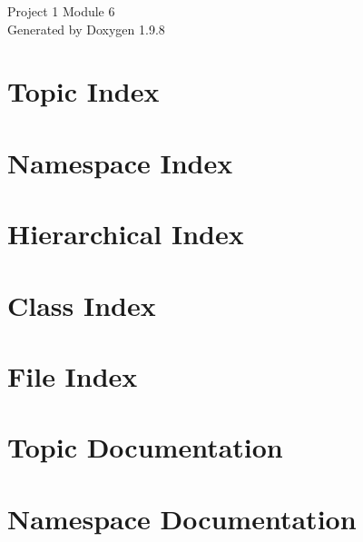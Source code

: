 \documentclass[twoside]{book}
\newcommand{\+}{\discretionary{\mbox{\scriptsize$\hookleftarrow$}}{}{}}
\newcommand{\clearemptydoublepage}{%
    \newpage{\pagestyle{empty}\cleardoublepage}%
  }
\begin{document}
  \raggedbottom
    \hypersetup{pageanchor=false,
                bookmarksnumbered=true,
                pdfencoding=unicode
               }
  \begin{titlepage}
  \vspace*{7cm}
  \begin{center}%
  {\Large Project 1 Module 6}\\
  \vspace*{1cm}
  {\large Generated by Doxygen 1.9.8}\\
  \end{center}
  \end{titlepage}
  \clearemptydoublepage
  \tableofcontents
  \clearemptydoublepage
  \hypersetup{pageanchor=true}

\chapter{Topic Index}

\chapter{Namespace Index}

\chapter{Hierarchical Index}

\chapter{Class Index}

\chapter{File Index}

\chapter{Topic Documentation}








\chapter{Namespace Documentation}

\end{document}

